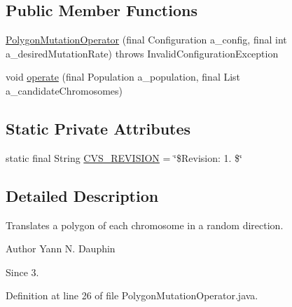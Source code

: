 \subsection*{Public Member Functions}
\begin{DoxyCompactItemize}
\item 
\hyperlink{classexamples_1_1monalisa_1_1core_1_1_polygon_mutation_operator_a83de8583906a2443b99f09c871aed50f}{Polygon\-Mutation\-Operator} (final Configuration a\-\_\-config, final int a\-\_\-desired\-Mutation\-Rate)  throws Invalid\-Configuration\-Exception 
\item 
void \hyperlink{classexamples_1_1monalisa_1_1core_1_1_polygon_mutation_operator_a007895c5c90286148d47ef8d1cd1ce93}{operate} (final Population a\-\_\-population, final List a\-\_\-candidate\-Chromosomes)
\end{DoxyCompactItemize}
\subsection*{Static Private Attributes}
\begin{DoxyCompactItemize}
\item 
static final String \hyperlink{classexamples_1_1monalisa_1_1core_1_1_polygon_mutation_operator_a3cec1ce37f5d974729392698531690b0}{C\-V\-S\-\_\-\-R\-E\-V\-I\-S\-I\-O\-N} = \char`\"{}\$Revision\-: 1. \$\char`\"{}
\end{DoxyCompactItemize}


\subsection{Detailed Description}
Translates a polygon of each chromosome in a random direction.

\begin{DoxyAuthor}{Author}
Yann N. Dauphin 
\end{DoxyAuthor}
\begin{DoxySince}{Since}
3. 
\end{DoxySince}


Definition at line 26 of file Polygon\-Mutation\-Operator.\-java.



